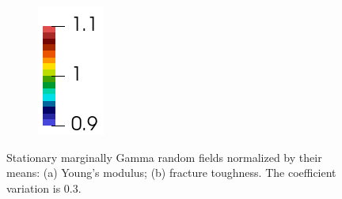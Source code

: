 \begin{figure}[!htbp]
\begin{subfigure}{0.1\textwidth}
    \includegraphics[width=\textwidth]{Chapter5/figures/spallation/colorbar_rf}
  \end{subfigure}
  \caption[Spatially varying Young's modulus and fracture toughness.]{Stationary marginally Gamma random fields normalized by their means: (a) Young's modulus; (b) fracture toughness. The coefficient variation is $0.3$.}
  \label{fig: Chapter5/spallation/random_fields}
\end{figure}

